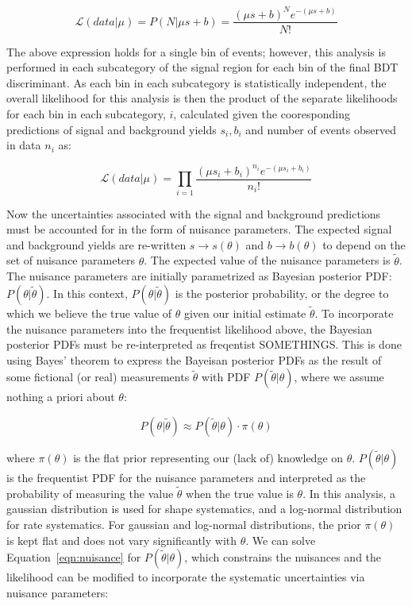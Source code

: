 \begin{equation}
\label{eqn:likelihood1}
\mathcal{L}(data|\mu) = P(N|\mu s+b) = \frac{(\mu s+b)^{N}e^{-(\mu s+b)}}{N!}
\end{equation}

\noindent The above expression holds for a single bin of events; however, this analysis is performed in each subcategory of the signal
region for each bin of the final BDT discriminant.
As each bin in each subcategory is statistically independent, the overall likelihood for this analysis is then the product of the
separate likelihoods for each bin in each subcategory, $i$,
calculated given the cooresponding predictions of signal and background yields $s_{i}, b_{i}$ and number of events observed in data $n_{i}$ as:

\begin{equation}
\label{eqn:likelihood2}
\mathcal{L}(data|\mu) = \prod_{i=1} \frac{(\mu s_{i}+b_{i})^{n_{i}}e^{-(\mu s_{i}+b_{i})}}{n_{i}!}
\end{equation}

\noindent Now the uncertainties associated with the signal and background predictions must be accounted for in the form of nuisance parameters. The expected signal
and background yields are re-written $s \rightarrow s(\theta)$ and $b \rightarrow b(\theta)$ to depend on the set of nuisance parameters $\theta$. The expected value of the nuisance
parameters is $\tilde{\theta}$. The nuisance parameters are initially parametrized as Bayesian posterior PDF: $P(\theta|\tilde{\theta})$.
In this context, $P(\theta|\tilde{\theta})$ is the posterior probability, or the degree to which we believe the true value of $\theta$ given our initial estimate $\tilde{\theta}$.
To incorporate the nuisance parameters into the frequentist likelihood above, the Bayesian posterior PDFs must be re-interpreted as freqentist SOMETHINGS.
This is done using Bayes' theorem to express the Bayeisan posterior PDFs as the result of some fictional (or real) measurements $\tilde{\theta}$ with PDF $P(\tilde{\theta}|\theta)$, where we assume nothing
a priori about $\theta$:

\begin{equation}
\label{eqn:nuisance}
P(\theta|\tilde{\theta}) \approx P(\tilde{\theta}|\theta) \cdot \pi(\theta)
\end{equation}

\noindent where $\pi(\theta)$ is the flat prior representing our (lack of) knowledge on $\theta$.
$P(\tilde{\theta}|\theta)$ is the frequentist PDF for the nuisance parameters and interpreted as the probability of measuring the value $\tilde{\theta}$ when the true value is $\theta$.
In this analysis, a gaussian distribution is used for shape systematics, and a log-normal distribution for rate systematics. For gaussian and log-normal distributions,
the prior $\pi(\theta)$ is kept flat and does not vary significantly with $\theta$. We can solve Equation~\ref{eqn:nuisance} for $P(\tilde{\theta}|\theta)$, which constrains the nuisances
and the likelihood can be modified to incorporate the systematic uncertainties via nuisance parameters:

